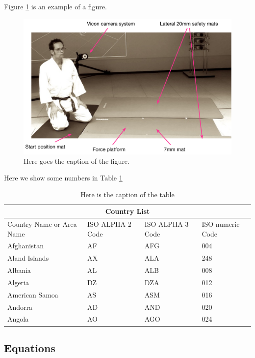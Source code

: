\documentclass[12pt,oneside,a4paper]{article}
\begin{document}
Figure \ref{fig.niceFigure} is an example of a figure.
\begin{figure}
\begin{center}
\includegraphics[width=0.6\columnwidth]{f2_expSetup}
\caption{Here goes the caption of the figure.}
\label{fig.niceFigure}
\end{center}
\end{figure}

Here we show some numbers in Table \ref{tab.someTable}


\begin{table}
\begin{center}
\begin{tabular}{|p{3cm}|p{3cm}|p{3cm}|p{3cm}|}
\hline
\multicolumn{4}{|c|}{Country List} \\
\hline
Country Name     or Area Name& ISO ALPHA 2 Code &ISO ALPHA 3 Code&ISO numeric Code\\
\hline
Afghanistan   & AF    &AFG&   004\\
Aland Islands&   AX  & ALA   &248\\
Albania &AL & ALB&  008\\
Algeria    &DZ & DZA&  012\\
American Samoa&   AS  & ASM&016\\
Andorra& AD  & AND   &020\\
Angola& AO  & AGO&024\\
\hline
\end{tabular}
\label{tab.someTable}
\caption{Here is the caption of the table}\vspace{8pt}
\end{center}
\end{table}

\subsection{Equations}
\end{document}
